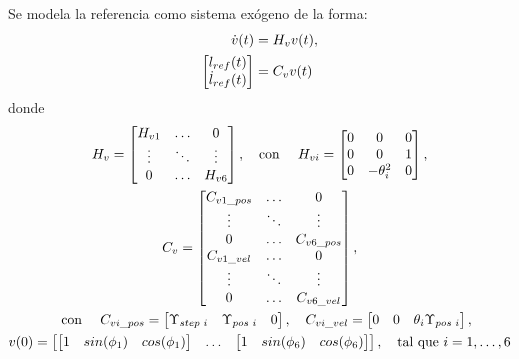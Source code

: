 Se modela la referencia como sistema exógeno de la forma:
\begin{align} \label{eq:ref_exogeno_LQI_OR}
    \dot{v}(t) & = H_v v(t), \notag \\
    \begin{bmatrix}
        l_{ref}(t) \\ \dot{l}_{ref}(t)
    \end{bmatrix} & = C_v v(t)
\end{align}
donde 
\begin{gather}
    H_v = \begin{bmatrix}
        H_{v1} & \hdots & 0 \\
        \vdots & \ddots & \vdots \\ 
        0 & \hdots & H_{v6}
    \end{bmatrix}, 
    \quad \textrm{con } \quad
    H_{vi} = \begin{bmatrix}
        0 & 0 & 0 \\
        0 & 0 & 1 \\
        0 & -\theta_i^2 & 0
    \end{bmatrix},  \\
    C_v = \begin{bmatrix}
        C_{v1\_pos} & \hdots & 0 \\
        \vdots & \ddots & \vdots \\ 
        0 & \hdots & C_{v6\_pos} \\
        C_{v1\_vel} & \hdots & 0 \\
        \vdots & \ddots & \vdots \\ 
        0 & \hdots & C_{v6\_vel}
    \end{bmatrix}, \notag \\
    \quad \textrm{con } \quad
    C_{vi\_pos} = \begin{bmatrix}
        \Upsilon_{step\textrm{ }i} & \Upsilon_{pos\textrm{ }i} & 0
    \end{bmatrix},
    \quad 
    C_{vi\_vel} = \begin{bmatrix}
        0 & 0 & \theta_i \Upsilon_{pos\textrm{ }i}
    \end{bmatrix}, \\
    v(0) = \begin{bmatrix}
        \begin{bmatrix} 1 & sin(\phi_1) & cos(\phi_1) \end{bmatrix} & \hdots & \begin{bmatrix} 1 & sin(\phi_6) & cos(\phi_6) \end{bmatrix} 
    \end{bmatrix}, \quad
    \textrm{tal que } i = 1,\hdots,6 \notag
\end{gather}

